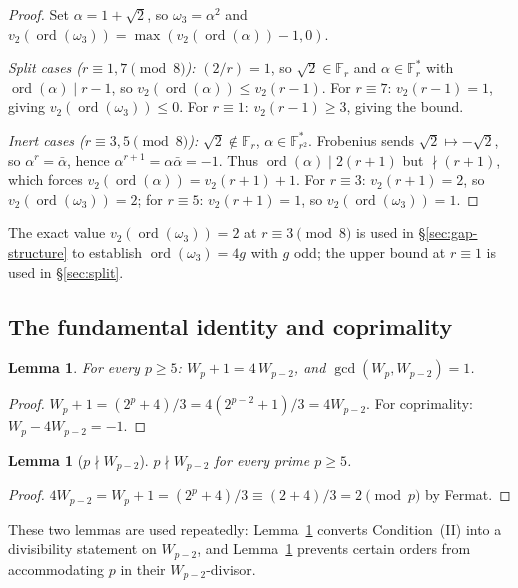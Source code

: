 \documentclass[11pt]{amsart}
\theoremstyle{plain}
\newtheorem{lemma}[theorem]{Lemma}
\theoremstyle{definition}
\theoremstyle{remark}
\numberwithin{equation}{section}
\newcommand{\ord}{\operatorname{ord}}
\newcommand{\F}{\mathbb{F}}
\begin{document}
\begin{proof}
Set $\alpha = 1 + \sqrt 2$, so $\omega_3 = \alpha^2$ and $v_2(\ord(\omega_3)) = \max(v_2(\ord(\alpha)) - 1, 0)$.

\emph{Split cases ($r \equiv 1, 7 \pmod 8$):} $(2/r) = 1$, so $\sqrt 2 \in \F_r$ and $\alpha \in \F_r^\ast$ with $\ord(\alpha) \mid r - 1$, so $v_2(\ord(\alpha)) \leq v_2(r - 1)$. For $r \equiv 7$: $v_2(r - 1) = 1$, giving $v_2(\ord(\omega_3)) \leq 0$. For $r \equiv 1$: $v_2(r - 1) \geq 3$, giving the bound.

\emph{Inert cases ($r \equiv 3, 5 \pmod 8$):} $\sqrt 2 \notin \F_r$, $\alpha \in \F_{r^2}^\ast$. Frobenius sends $\sqrt 2 \mapsto -\sqrt 2$, so $\alpha^r = \bar\alpha$, hence $\alpha^{r+1} = \alpha \bar\alpha = -1$. Thus $\ord(\alpha) \mid 2(r+1)$ but $\nmid (r+1)$, which forces $v_2(\ord(\alpha)) = v_2(r+1) + 1$. For $r \equiv 3$: $v_2(r+1) = 2$, so $v_2(\ord(\omega_3)) = 2$; for $r \equiv 5$: $v_2(r+1) = 1$, so $v_2(\ord(\omega_3)) = 1$.
\end{proof}

The exact value $v_2(\ord(\omega_3)) = 2$ at $r \equiv 3 \pmod 8$ is used in \S\ref{sec:gap-structure} to establish $\ord(\omega_3) = 4 g$ with $g$ odd; the upper bound at $r \equiv 1$ is used in \S\ref{sec:split}.

\subsection{The fundamental identity and coprimality}

\begin{lemma}\label{lem:fundamental}
For every $p \geq 5$: $W_p + 1 = 4\,W_{p-2}$, and $\gcd(W_p, W_{p-2}) = 1$.
\end{lemma}

\begin{proof}
$W_p + 1 = (2^p + 4)/3 = 4 (2^{p-2} + 1)/3 = 4 W_{p-2}$. For coprimality: $W_p - 4 W_{p-2} = -1$.
\end{proof}

\begin{lemma}[$p \nmid W_{p-2}$]\label{lem:pndivW}
$p \nmid W_{p-2}$ for every prime $p \geq 5$.
\end{lemma}

\begin{proof}
$4 W_{p-2} = W_p + 1 = (2^p + 4)/3 \equiv (2 + 4)/3 = 2 \pmod p$ by Fermat.
\end{proof}

These two lemmas are used repeatedly: Lemma~\ref{lem:fundamental} converts Condition~(II) into a divisibility statement on $W_{p-2}$, and Lemma~\ref{lem:pndivW} prevents certain orders from accommodating $p$ in their $W_{p-2}$-divisor.
\end{document}
